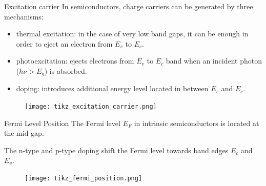 \documentclass[10pt,compress,handout]{beamer}
\begin{document}
    \begin{frame}{Excitation carrier}
        In semiconductors, charge carriers can be generated by three mechanisms: 
        \begin{itemize}
            \item thermal excitation: in the case of very low band gaps, it can be enough in order 
            to eject an electron from $E_v$ to $E_c$.
            \item photoexcitation: ejects electrons from $E_v$ to $E_c$
            band when an incident photon ($h\nu > E_g$) is absorbed.
            \item doping: introduces additional energy level located in between $E_v$ and $E_c$.
        \end{itemize}
        
        \begin{figure}[h]
            \centering
            \texttt{[image: tikz\_excitation\_carrier.png]}
            \label{fig_excitation_carrier}
        \end{figure}
    \end{frame}

    \begin{frame}{Fermi Level Position}
        The Fermi level $E_F$ in intrinsic semiconductors is located at the mid-gap. 
        
        The n-type and p-type doping shift the Fermi level towards band edges 
        $E_c$ and $E_v$.
        
        \begin{figure}[H]
            \centering
            \texttt{[image: tikz\_fermi\_position.png]}
            \label{fig_fermi_position}
        \end{figure}
    \end{frame}
\end{document}
